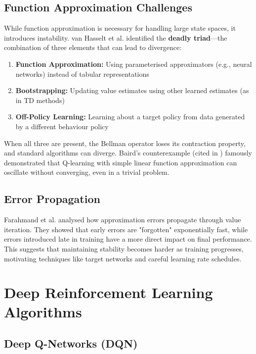 \documentclass[12pt,a4paper]{report}
\begin{document}
\subsection{Function Approximation Challenges}

While function approximation is necessary for handling large state spaces, it introduces instability. van Hasselt et al. \cite{van2018deep} identified the \textbf{deadly triad}—the combination of three elements that can lead to divergence:

\begin{enumerate}
    \item \textbf{Function Approximation:} Using parameterised approximators (e.g., neural networks) instead of tabular representations
    \item \textbf{Bootstrapping:} Updating value estimates using other learned estimates (as in TD methods)
    \item \textbf{Off-Policy Learning:} Learning about a target policy from data generated by a different behaviour policy
\end{enumerate}

When all three are present, the Bellman operator loses its contraction property, and standard algorithms can diverge. Baird's counterexample (cited in \cite{van2018deep}) famously demonstrated that Q-learning with simple linear function approximation can oscillate without converging, even in a trivial problem.

\subsection{Error Propagation}

Farahmand et al. \cite{farahmand2010error} analysed how approximation errors propagate through value iteration. They showed that early errors are "forgotten" exponentially fast, while errors introduced late in training have a more direct impact on final performance. This suggests that maintaining stability becomes harder as training progresses, motivating techniques like target networks and careful learning rate schedules.

\section{Deep Reinforcement Learning Algorithms}

\subsection{Deep Q-Networks (DQN)}
\end{document}
